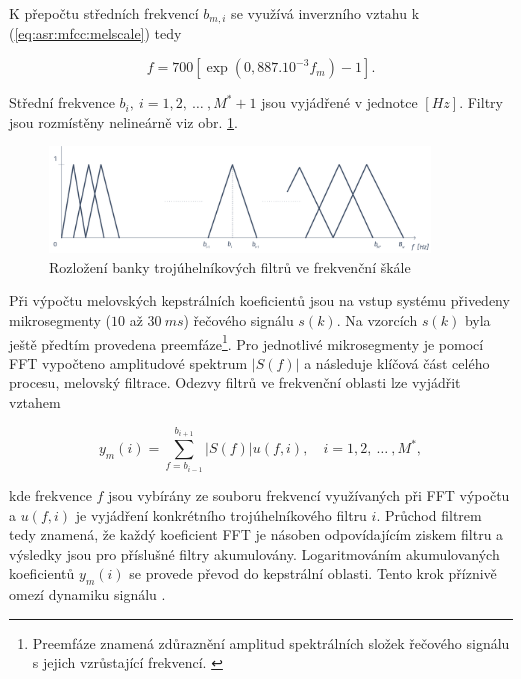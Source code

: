 \noindent K přepočtu středních frekvencí $b_{m,i}$ se využívá inverzního vztahu k (\ref{eq:asr:mfcc:melscale}) tedy

\begin{equation}
  f = 700 \left[ \exp\left( 0,887.10^{-3} f_m \right) - 1 \right].
  \label{eq:asr:mfcc:melscale:inverse}
\end{equation}

\noindent Střední frekvence $b_i,\ i=1,2,\ \dots\ , M^{*}+1$ jsou vyjádřené v jednotce $[Hz]$. Filtry jsou rozmístěny nelineárně viz obr. \ref{fig:asr:mfcc:bank:hz}.

\begin{figure}[hbpt]
  \centering
  \includegraphics[width=0.9\textwidth]{./ch4-asr/img/filter_bank-hz.pdf}
  \caption{Rozložení banky trojúhelníkových filtrů ve frekvenční škále}
  \label{fig:asr:mfcc:bank:hz}
\end{figure}

Při výpočtu melovských kepstrálních koeficientů jsou na vstup systému přivedeny mikrosegmenty ($10$ až $30\ ms$) řečového signálu $s(k)$. Na vzorcích $s(k)$ byla ještě předtím provedena preemfáze\footnote{Preemfáze znamená zdůraznění amplitud spektrálních složek řečového signálu s jejich vzrůstající frekvencí. \cite{Psutka2006}}. Pro jednotlivé mikrosegmenty je pomocí FFT vypočteno amplitudové spektrum $\left| S(f) \right|$ a následuje klíčová část celého procesu, melovský filtrace. Odezvy filtrů ve frekvenční oblasti lze vyjádřit vztahem

\begin{equation}
  y_m(i) = \sum_{f=b_{i-1}}^{b_{i+1}} \left| S(f) \right| u\left(f, i\right),  \quad i = 1, 2,\ \dots\ ,M^{*},
  \label{eq:asr:mfcc:freq:responce}
\end{equation}

\noindent kde frekvence $f$ jsou vybírány ze souboru frekvencí využívaných při FFT výpočtu a $u(f, i)$ je vyjádření konkrétního trojúhelníkového filtru $i$. Průchod filtrem tedy znamená, že každý koeficient FFT je násoben odpovídajícím ziskem filtru a výsledky jsou pro příslušné filtry akumulovány. Logaritmováním akumulovaných koeficientů $y_{m}(i)$ se provede převod do kepstrální oblasti. Tento krok příznivě omezí dynamiku signálu \cite{Benesty2007}.

